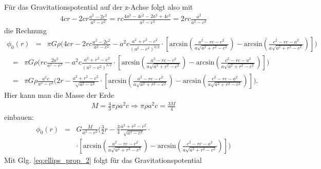 \documentclass{book}
\renewcommand{\arcsin}{\text{arcsin}}
\begin{document}
%
Für das Gravitationspotential auf der z-Achse folgt also mit
%
\begin{eqnarray}
4cr - 2cr\frac{a^2 - 2c^2}{a^2 - c^2} = rc\frac{4a^2 - 4c^2 - 2a^2 + 4c^2}{a^2 - c^2} = 2rc\frac{a^2}{a^2 - c^2}
\end{eqnarray}
%
die Rechnung
%
\begin{eqnarray}
\phi_0\left(r\right) & = & \pi G\rho\bigg(4cr - 2rc\frac{a^2 - 2c^2}{a^2 - c^2} - a^2c\frac{a^2 + r^2 - c^2}{\left(a^2 - c^2\right)^{3/2}}\cdot\left[\arcsin\left(\frac{a^2 - rc - c^2}{a\sqrt{a^2 + r^2 - c^2}}\right) - \arcsin\left(\frac{c^2 - rc - a^2}{a\sqrt{a^2 + r^2 - c^2}}\right)\right]\bigg)\nonumber
\end{eqnarray}
\begin{eqnarray}
& = & \pi G\rho\bigg(rc\frac{2a^2}{a^2 - c^2} - a^2c\frac{a^2 + r^2 - c^2}{\left(a^2 - c^2\right)^{3/2}}\cdot\left[\arcsin\left(\frac{a^2 - rc - c^2}{a\sqrt{a^2 + r^2 - c^2}}\right) - \arcsin\left(\frac{c^2 - rc - a^2}{a\sqrt{a^2 + r^2 - c^2}}\right)\right]\bigg)\nonumber\\
& = & \pi G\rho\frac{a^2c}{a^2 - c^2}\bigg(2r - \frac{a^2 + r^2 - c^2}{\sqrt{a^2 - c^2}}\cdot\left[\arcsin\left(\frac{a^2 - rc - c^2}{a\sqrt{a^2 + r^2 - c^2}}\right) - \arcsin\left(\frac{c^2 - rc - a^2}{a\sqrt{a^2 + r^2 - c^2}}\right)\right]\bigg).
\end{eqnarray}
%
Hier kann man die Masse der Erde
%
\begin{eqnarray}
M = \frac{4}{3}\pi\rho a^2c\Rightarrow \pi\rho a^2c = \frac{3M}{4}
\end{eqnarray}
%
einbauen:
%
\begin{eqnarray}
\phi_0\left(r\right) & = & G\frac{M}{a^2 - c^2}\bigg(\frac{3}{2}r - \frac{3}{4}\frac{a^2 + r^2 - c^2}{\sqrt{a^2 - c^2}}\cdot\nonumber\\
&&\cdot\left[\arcsin\left(\frac{a^2 - rc - c^2}{a\sqrt{a^2 + r^2 - c^2}}\right) - \arcsin\left(\frac{c^2 - rc - a^2}{a\sqrt{a^2 + r^2 - c^2}}\right)\right]\bigg)
\end{eqnarray}
%
Mit Glg. \eqref{eq:ellips_prop_2} folgt für das Gravitationspotential 
%
\end{document}
